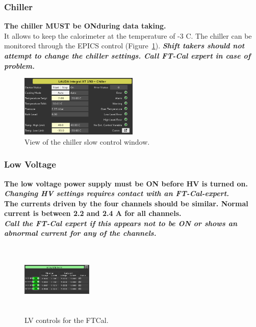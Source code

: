 \documentclass[11.5pt]{article}
\begin{document}
\subsubsection{Chiller}\label{sec:ft-chiller}
\textbf{The chiller MUST be ONduring data taking.}\\ 
It allows to keep the calorimeter at the temperature of -3 C. The chiller can be monitored through the EPICS control (Figure~\ref{ChillerCam}). 
\textit{\textbf{Shift takers should not attempt to change the chiller settings. Call FT-Cal expert in case of problem.}}
\begin{figure}[ht]
\center
\includegraphics[width=0.5\textwidth]{pics/Chiller_Slwcntrl.png}
\caption{ \label{ChillerCam} View of the chiller slow control window.}
\end{figure}

\subsubsection{Low Voltage}\label{sec:ft-lv}
\textbf{The low voltage power supply must be ON before HV is turned on.\\} 
\textbf{\textit{Changing HV settings requires contact with an FT-Cal-expert.\\}}
\textbf{The currents driven by the four channels should be similar. Normal current is between 2.2 and 2.4 A for all channels.\\}
\textbf{\textit{Call the FT-Cal expert if this appears not to be ON or shows an abnormal current for any of the channels.}} 
\begin{figure}[ht]
\center
\includegraphics[width=0.3\textwidth,height=3.5cm]{pics/LV.png}
\caption{ LV controls for the FTCal. }
\end{figure}
\newpage
\end{document}
